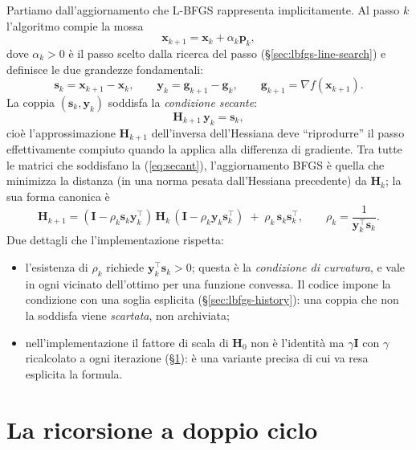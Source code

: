 Partiamo dall'aggiornamento che L-BFGS rappresenta implicitamente. Al passo
$k$ l'algoritmo compie la mossa
\begin{equation}
\bm{x}_{k+1} = \bm{x}_k + \alpha_k \bm{p}_k,
\end{equation}
dove $\alpha_k > 0$ è il passo scelto dalla ricerca del passo (\/\S\ref{sec:lbfgs-line-search})
e definisce le due grandezze fondamentali:
\begin{equation}
\label{eq:s-y}
\bm{s}_k = \bm{x}_{k+1} - \bm{x}_k,
\qquad
\bm{y}_k = \bm{g}_{k+1} - \bm{g}_k,
\qquad
\bm{g}_{k+1} = \nabla f(\bm{x}_{k+1}).
\end{equation}
La coppia $(\bm{s}_k,\bm{y}_k)$ soddisfa la \emph{condizione secante}:
\begin{equation}
\label{eq:secant}
\bm{H}_{k+1}\,\bm{y}_k = \bm{s}_k,
\end{equation}
cioè l'approssimazione $\bm{H}_{k+1}$ dell'inversa dell'Hessiana deve
``riprodurre'' il passo effettivamente compiuto quando la applica alla
differenza di gradiente. Tra tutte le matrici che soddisfano la (\ref{eq:secant}),
l'aggiornamento BFGS è quella che minimizza la distanza (in una norma pesata
dall'Hessiana precedente) da $\bm{H}_k$; la sua forma canonica è
\begin{equation}
\label{eq:bfgs-update}
\bm{H}_{k+1} =
(\bm{I} - \rho_k \bm{s}_k \bm{y}_k^{\!\top})\,
\bm{H}_k\,
(\bm{I} - \rho_k \bm{y}_k \bm{s}_k^{\!\top})
\;+\; \rho_k\, \bm{s}_k \bm{s}_k^{\!\top},
\qquad
\rho_k = \frac{1}{\bm{y}_k^{\!\top}\bm{s}_k}.
\end{equation}
Due dettagli che l'implementazione rispetta:

\begin{itemize}
\item l'esistenza di $\rho_k$ richiede $\bm{y}_k^{\!\top}\bm{s}_k > 0$;
  questa è la \emph{condizione di curvatura}, e vale in ogni vicinato
  dell'ottimo per una funzione convessa. Il codice impone la condizione con
  una soglia esplicita (\/\S\ref{sec:lbfgs-history}): una coppia che non la
  soddisfa viene \emph{scartata}, non archiviata;
\item nell'implementazione il fattore di scala di $\bm{H}_0$ non è l'identità
  ma $\gamma \bm{I}$ con $\gamma$ ricalcolato a ogni iterazione
  (\/\S\ref{sec:lbfgs-twoloop}): è una variante precisa di cui va resa
  esplicita la formula.
\end{itemize}

\section{La ricorsione a doppio ciclo}
\label{sec:lbfgs-twoloop}

